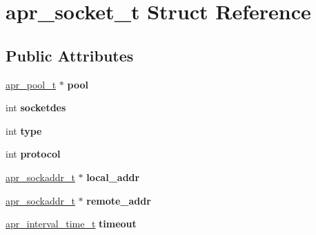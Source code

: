 \hypertarget{structapr__socket__t}{}\section{apr\+\_\+socket\+\_\+t Struct Reference}
\label{structapr__socket__t}
\subsection*{Public Attributes}
\begin{DoxyCompactItemize}
\item 
\mbox{\label{structapr__socket__t_a122d4e497509ed40dd450119a8aa1cd2}} 
\mbox{\hyperlink{group__apr__pools_gaf137f28edcf9a086cd6bc36c20d7cdfb}{apr\+\_\+pool\+\_\+t}} $\ast$ {\bfseries pool}
\item 
\mbox{\label{structapr__socket__t_acd1a084790ce6cb462825fc029000095}} 
int {\bfseries socketdes}
\item 
\mbox{\label{structapr__socket__t_a722ea4796e2227c8b0821d1d75ea0b07}} 
int {\bfseries type}
\item 
\mbox{\label{structapr__socket__t_a89e0cf9d8e6d443c5d69d7f813ef9df7}} 
int {\bfseries protocol}
\item 
\mbox{\label{structapr__socket__t_ae310bbeb00298cd45c03dca515289239}} 
\mbox{\hyperlink{structapr__sockaddr__t}{apr\+\_\+sockaddr\+\_\+t}} $\ast$ {\bfseries local\+\_\+addr}
\item 
\mbox{\label{structapr__socket__t_a487dc49f378bdc6ad32d362b9fe575a2}} 
\mbox{\hyperlink{structapr__sockaddr__t}{apr\+\_\+sockaddr\+\_\+t}} $\ast$ {\bfseries remote\+\_\+addr}
\item 
\mbox{\label{structapr__socket__t_a3626689cdb39190d306a43cbd7f9e90c}} 
\mbox{\hyperlink{group__apr__time_gaae2129185a395cc393f76fabf4f43e47}{apr\+\_\+interval\+\_\+time\+\_\+t}} {\bfseries timeout}
\item 
\mbox{\label{structapr__socket__t_a737f257434cad45a1c44ad653f1e5964}} 

\end{DoxyCompactItemize}
